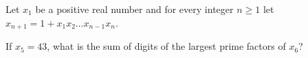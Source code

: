 Let $x_{1}$ be a positive real number and for every integer $n \geq 1$ let $x_{n+1} = 1 + x_{1}x_{2}\ldots x_{n-1}x_{n}$.

If $x_{5} = 43$, what is the sum of digits of the largest prime factors of $x_{6}$?
